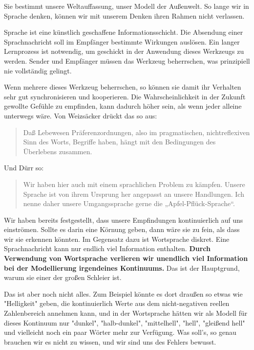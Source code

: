 \documentclass[12pt]{book}
\begin{document}
Sie bestimmt unsere Weltauffassung, unser Modell der Außenwelt. So lange wir in Sprache denken, können wir mit unserem Denken ihren Rahmen nicht verlassen. 

Sprache ist eine künstlich geschaffene Informationsschicht. Die Absendung einer Sprachnachricht soll im Empfänger bestimmte Wirkungen auslösen. Ein langer Lernprozess ist notwendig, um geschickt in der Anwendung dieses Werkzeugs zu werden. Sender und Empfänger müssen das Werkzeug beherrschen, was prinzipiell nie vollständig gelingt.

Wenn mehrere dieses Werkzeug beherrschen, so können sie damit ihr Verhalten sehr gut synchronisieren und kooperieren. Die Wahrscheinlichkeit in der Zukunft gewollte Gefühle zu empfinden, kann dadurch höher sein, als wenn jeder alleine unterwegs wäre. Von Weizsäcker drückt das so aus:

\begin{quote}\begin{tcolorbox}
Daß Lebewesen Präferenzordnungen, also im pragmatischen, nichtreflexiven Sinn des Worts, Begriffe haben, hängt mit den Bedingungen des Überlebens zusammen.
\end{tcolorbox}\end{quote}

Und Dürr so:
\begin{quote}\begin{tcolorbox}
Wir haben hier auch mit einem sprachlichen Problem zu kämpfen. Unsere Sprache ist von ihrem Ursprung her angepasst an unsere Handlungen. Ich nenne daher unsere Umgangssprache gerne die „Apfel-Pflück-Sprache“.
\end{tcolorbox}\end{quote}

Wir haben bereits festgestellt, dass unsere Empfindungen kontinuierlich auf uns einströmen. Sollte es darin eine Körnung geben, dann wäre sie zu fein, als dass wir sie erkennen könnten. Im Gegensatz dazu ist Wortsprache diskret. Eine Sprachnachricht kann nur endlich viel Information enthalten. \textbf{Durch Verwendung von Wortsprache verlieren wir unendlich viel Information bei der Modellierung irgendeines Kontinuums.} Das ist der Hauptgrund, warum sie einer der großen Schleier ist.

Das ist aber noch nicht alles. Zum Beispiel könnte es dort draußen so etwas wie "Helligkeit" geben, die kontinuierlich Werte aus dem nicht-negativen reellen Zahlenbereich annehmen kann, und in der Wortsprache hätten wir als Modell für dieses Kontinuum nur "dunkel", "halb-dunkel", "mittelhell", "hell", "gleißend hell" und vielleicht noch ein paar Wörter mehr zur Verfügung. Was soll's, so genau brauchen wir es nicht zu wissen, und wir sind uns des Fehlers bewusst. 
\end{document}
